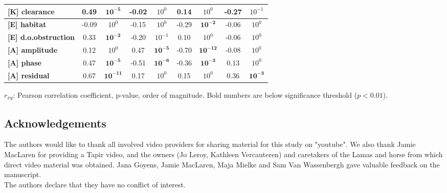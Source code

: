 \begin{table}[!ht]
\begin{tabular}{l @{$\quad$} cc @{$\quad$} cc @{$\quad$} cc @{$\quad$} cc}
\textbf{[K] clearance        } &                     0.49 &      $\mathbf{10^{-5}}$ &                    -0.02 &   $10^{0}$ &                     0.14 &   $10^{0}$ &                    -0.27 &  $10^{-1}$ \\
\midrule\textbf{[E] habitat          } &                    -0.09 &   $10^{0}$ &                    -0.15 &   $10^{0}$ &                    -0.29 &      $\mathbf{10^{-2}}$ &                    -0.06 &   $10^{0}$ \\
\textbf{[E] d.o.obstruction  } &                     0.33 &      $\mathbf{10^{-2}}$ &                    -0.20 &  $10^{-1}$ &                     0.10 &   $10^{0}$ &                    -0.06 &   $10^{0}$ \\
\midrule\textbf{[A] amplitude        } &                     0.12 &   $10^{0}$ &                     0.47 &      $\mathbf{10^{-5}}$ &                    -0.70 &     $\mathbf{10^{-12}}$ &                    -0.08 &   $10^{0}$ \\
\textbf{[A] phase            } &                     0.47 &      $\mathbf{10^{-5}}$ &                    -0.51 &      $\mathbf{10^{-6}}$ &                    -0.36 &      $\mathbf{10^{-3}}$ &                     0.13 &   $10^{0}$ \\
\textbf{[A] residual         } &                     0.67 &     $\mathbf{10^{-11}}$ &                     0.17 &   $10^{0}$ &                     0.15 &   $10^{0}$ &                     0.36 &      $\mathbf{10^{-3}}$ \\
\bottomrule
\end{tabular}\bigskip
\begin{flushleft}
$r_{xy}$: Pearson correlation coefficient,  p-value, order of magnitude. Bold numbers are below significance threshold ($p < 0.01$).
\end{flushleft}
\label{tab:correlations}
\end{table}





\FloatBarrier\pagebreak

\subsection{Acknowledgements}
The authors would like to thank all involved video providers for sharing material for this study on "youtube". 
We also thank Jamie MacLaren for providing a Tapir video, and the owners (Jo Leroy, Kathleen Vercauteren) and caretakers of the Lamas and horse from which direct video material was obtained. 
Jana Goyens, Jamie MacLaren, Maja Mielke and Sam Van Wassenbergh gave valuable feedback on the manuscript.
\bigskip\\
The authors declare that they have no conflict of interest.





